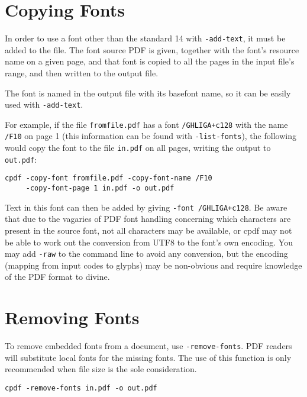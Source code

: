 \documentclass{book}
\begin{document}
\section{Copying Fonts}
\label{copyfont}

In order to use a font other than the standard 14 with \verb!-add-text!, it
must be added to the file. The font source PDF is given, together with the
font's resource name on a given page, and that font is copied to all the pages
in the input file's range, and then written to the output file.

The font is named in the output file with its basefont name, so it can be
easily used with \verb!-add-text!.

For example, if the file \verb!fromfile.pdf! has a font \verb!/GHLIGA+c128! with
the name \verb!/F10! on page 1 (this information can be found with
\verb!-list-fonts!), the following would copy the font to the file
\verb!in.pdf! on all pages, writing the output to \verb!out.pdf!:
  \begin{framed}
  \small\noindent\verb!cpdf -copy-font fromfile.pdf -copy-font-name /F10!\\
  \small\noindent\verb!     -copy-font-page 1 in.pdf -o out.pdf!
  \end{framed}

\noindent Text in this font can then be added by giving \verb!-font /GHLIGA+c128!. Be
aware that due to the vagaries of PDF font handling concerning which characters
are present in the source font, not all characters may be available, or cpdf may not be able to work out the conversion from UTF8 to the font's own encoding. You may add \texttt{-raw} to the command line to avoid any conversion, but the encoding (mapping from input codes to glyphs) may be non-obvious and require knowledge of the PDF format to divine.

\section{Removing Fonts}
\label{removefont}

To remove embedded fonts from a document, use \verb!-remove-fonts!. PDF readers will
substitute local fonts for the missing fonts. The use of this function is only
recommended when file size is the sole consideration.

  \begin{framed}
  \small\noindent\verb!cpdf -remove-fonts in.pdf -o out.pdf!
  \vspace{2.5mm}
  \end{framed}
\end{document}
